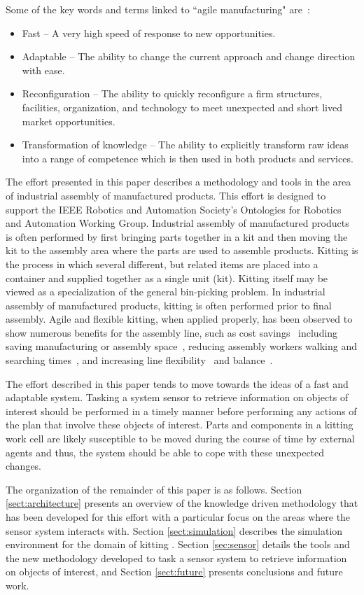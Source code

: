 Some of the key words and terms linked to ``agile manufacturing" are~\cite{KIDD.2000}:
\begin{itemize}
\item Fast -- A very high speed of response to new opportunities.
\item Adaptable -- The ability to change the current approach and change direction with ease.
\item Reconfiguration -- The ability to quickly reconfigure a firm structures, facilities, organization, and technology to meet unexpected and short lived market opportunities.
\item Transformation of knowledge -- The ability to explicitly transform raw ideas into a range of competence which is then used in both products and services.
\end{itemize}

The effort presented in this paper describes a methodology and tools in the area of industrial assembly of manufactured products. This effort is designed to support the IEEE Robotics and Automation Society's Ontologies for Robotics and Automation Working Group. Industrial assembly of manufactured products is often performed by first bringing parts together in a kit and then moving the kit to the assembly area where the parts are used to assemble products. Kitting is the process in which several different, but related items are placed into a container and supplied together as a single unit (kit). Kitting itself may be viewed as a specialization of the general bin-picking problem. In industrial assembly of manufactured products, kitting is often performed prior to final assembly. Agile and flexible kitting, when applied properly, has been observed to show numerous benefits for the assembly line, such as cost savings~\cite{Carlsson_2008} including saving manufacturing or assembly space~\cite{Medbo2003}, reducing assembly workers walking and searching times~\cite{Schwind1992}, and increasing line flexibility~\cite{Bozer1992} and balance~\cite{Jiao2000}.

The effort described in this paper tends to move towards the ideas of a fast and adaptable system. Tasking a system sensor to retrieve information on objects of interest should be performed in a timely manner before performing any actions of the plan that involve these objects of interest. Parts and components in a kitting work cell are likely susceptible to be moved during the course of time by external agents and thus, the system should be able to cope with these unexpected changes.




The organization of the remainder of this paper is as follows. Section \ref{sect:architecture} presents an overview of the knowledge driven methodology that has been developed for this effort with a particular focus on the areas where the sensor system interacts with. Section \ref{sect:simulation} describes the simulation environment for the domain of kitting . Section \ref{sec:sensor} details the tools and the new methodology developed to task a sensor system to retrieve information on objects of interest, and Section \ref{sect:future} presents conclusions and future work.